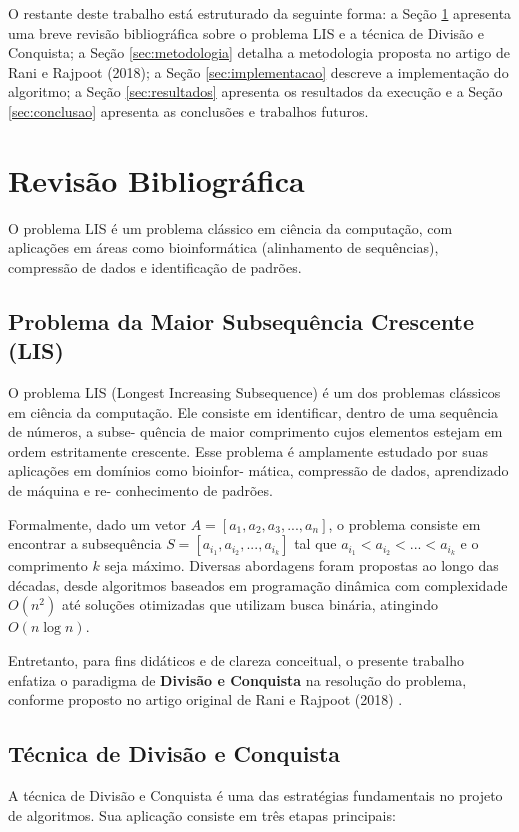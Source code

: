 \documentclass[por]{ajceam-class}
\begin{document}
O restante deste trabalho está estruturado da seguinte forma: a Seção \ref{sec:revisao} apresenta uma breve revisão bibliográfica sobre o problema LIS e a técnica de Divisão e Conquista; a Seção \ref{sec:metodologia} detalha a metodologia proposta no artigo de Rani e Rajpoot (2018); a Seção \ref{sec:implementacao} descreve a implementação do algoritmo; a Seção \ref{sec:resultados} apresenta os resultados da execução e a Seção \ref{sec:conclusao} apresenta as conclusões e trabalhos futuros.

\section{Revisão Bibliográfica}
\label{sec:revisao}
O problema LIS é um problema clássico em ciência da computação, com aplicações em áreas como bioinformática (alinhamento de sequências), compressão de dados e identificação de padrões.

\subsection{Problema da Maior Subsequência Crescente (LIS)}
O problema LIS (Longest Increasing Subsequence) é um dos
problemas clássicos em ciência da computação. Ele consiste
em identificar, dentro de uma sequência de números, a subse-
quência de maior comprimento cujos elementos estejam em
ordem estritamente crescente. Esse problema é amplamente
estudado por suas aplicações em domínios como bioinfor-
mática, compressão de dados, aprendizado de máquina e re-
conhecimento de padrões.

Formalmente, dado um vetor $A = [a_1, a_2, a_3, ..., a_n]$, o problema consiste em encontrar a subsequência $S = [a_{i_1}, a_{i_2}, ..., a_{i_k}]$ tal que $a_{i_1} < a_{i_2} < ... < a_{i_k}$ e o comprimento $k$ seja máximo.  
Diversas abordagens foram propostas ao longo das décadas, desde algoritmos baseados em programação dinâmica com complexidade $O(n^2)$ até soluções otimizadas que utilizam busca binária, atingindo $O(n \log n)$.

Entretanto, para fins didáticos e de clareza conceitual, o presente trabalho enfatiza o paradigma de \textbf{Divisão e Conquista} na resolução do problema, conforme proposto no artigo original de Rani e Rajpoot (2018) \cite{Rani2018}.

\subsection{Técnica de Divisão e Conquista}
A técnica de Divisão e Conquista é uma das estratégias fundamentais no projeto de algoritmos. Sua aplicação consiste em três etapas principais:
\end{document}
